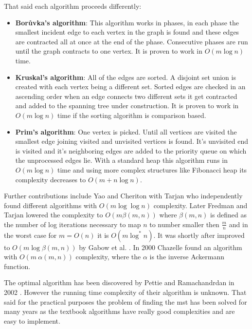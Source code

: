 That said each algorithm proceeds differently:
\begin{itemize}
    \item \textbf{Borůvka's algorithm}: This algorithm works in phases, in each phase the smallest incident edge to each vertex in the graph is found and these edges are contracted all at once at the end of the phase. Consecutive phases are run until the graph contracts to one vertex. It is proven to work in $O(m\log{n})$ time.
    
    \item \textbf{Kruskal's algorithm}:
    All of the edges are sorted. A disjoint set union is created with each vertex being a different set. Sorted edges are checked in an ascending order when an edge connects two different sets it get contracted and added to the spanning tree under construction. It is proven to work in $O(m\log{n})$ time if the sorting algorithm is comparison based.
    
    \item \textbf{Prim's algorithm}:
    One vertex is picked. Until all vertices are visited the smallest edge joining visited and unvisited vertices is found. It's unvisited end is visited and it's neighboring edges are added to the priority queue on which the unprocessed edges lie. With a standard heap this algorithm runs in $O(m\log{n})$ time and using more complex structures like Fibonacci heap \cite{FredmanTarjan} its complexity decreases to $O(m  + n\log{n})$.
\end{itemize}

Further contributions include Yao \cite{yao} and Cheriton with Tarjan \cite{cherTarj} who independently found different algorithms with $O(m \log{\log{n}})$ complexity. Later Fredman and Tarjan \cite{FredmanTarjan} lowered the complexity to $O(m \beta(m, n))$ where $\beta(m, n)$ is defined as the number of log iterations necessary to map $n$ to number smaller then $\frac{m}n$ and in the worst case for $m = O(n)$ it is $O(m\log^*{n})$. It was shortly after improved to $O(m\log{\beta(m,n)})$ by Gabow et al. \cite{gabowEtAl}. In 2000 Chazelle \cite{C2000} found an algorithm with $O(m\ \alpha(m, n))$ complexity, where the $\alpha$ is the inverse Ackermann function.

The optimal algorithm has been discovered by Pettie and Ramachandrdan in 2002 \cite{optimal}. However the running time complexity of their algorithm is unknown. That said for the practical purposes the problem of finding the mst has been solved for many years as the textbook algorithms have really good complexities and are easy to implement. 

